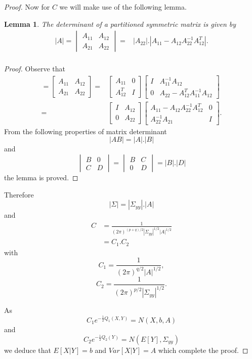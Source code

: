 \documentclass{article}
\newtheorem{lem}[thm]{Lemma}
\theoremstyle{definition}
\theoremstyle{remark}
\begin{document}
\begin{proof}
Now for $C$ we will make use of the following lemma.\\
\begin{lem}
The determinant of a partitioned symmetric matrix is given by\\
\begin{align*}
|A|=\begin{vmatrix}
A_{11} & A_{12} \\ 
A_{21} & A_{22}
\end{vmatrix}
=&|A_{22}|.|A_{11}-A_{12}A_{22}^{-1}A_{12}^T|.\\
\end{align*}
\end{lem}
\begin{proof}
Observe that 
\begin{align*}
[A]=\begin{bmatrix}
A_{11} & A_{12} \\ 
A_{21} & A_{22}
\end{bmatrix}
=&\begin{bmatrix}
A_{11} & 0 \\ 
A_{12}^T & I
\end{bmatrix}
\begin{bmatrix}
I & A_{11}^{-1}A_{12} \\ 
0 & A_{22}-A_{12}^TA_{11}^{-1}A_{12}
\end{bmatrix}\\
%
=&\begin{bmatrix}
I & A_{12} \\ 
0 & A_{22}
\end{bmatrix}
\begin{bmatrix}
A_{11}-A_{12}A_{22}^{-1}A_{12}^T & 0\\ 
A_{22}^{-1}A_{21} & I
\end{bmatrix}.
\end{align*}
From the following properties of matrix determinant
$$|AB|=|A|.|B|$$
and
$$
\begin{vmatrix}
B & 0 \\ 
C & D
\end{vmatrix}=
\begin{vmatrix}
B & C \\ 
0 & D
\end{vmatrix}=
|B|.|D|
$$
the lemma is proved.
\end{proof}
Therefore
$$|\Sigma |=|\Sigma_{yy}|.|A|$$
and 
\begin{align*}
C&=\frac{1}{(2\pi)^{(p+q)/2}|\Sigma_{yy}|^{1/2}|A|^{1/2}}\\
&=C_1.C_2
\end{align*}
with
$$C_1=\frac{1}{(2\pi)^{q/2}|A|^{1/2}},$$
$$C_2=\frac{1}{(2\pi)^{p/2}|\Sigma_{yy}|^{1/2}}.$$

As $$C_1e^{-\frac{1}{2}Q_1(X,Y)}=N(X,b,A)$$
and $$C_2e^{-\frac{1}{2}Q_2(Y)}=N(E[Y],\Sigma_{yy})$$
we deduce that $E[X|Y]=b$ and $Var[X|Y]=A$ which complete the proof.
\end{proof}
\end{document}
